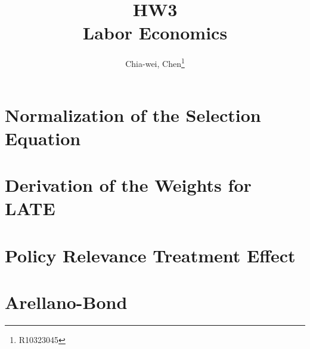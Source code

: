 \documentclass[12pt]{article}
\author{Chia-wei, Chen\thanks{R10323045}}
\title{HW3 \\ Labor Economics}
\begin{document}
    \maketitle
    \section{Normalization of the Selection Equation}
    

    \section{Derivation of the Weights for LATE}
    

    \section{Policy Relevance Treatment Effect}
    

    \section{Arellano-Bond}
    
\end{document}
